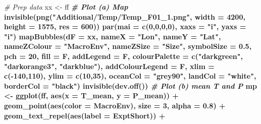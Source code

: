 \documentclass[
]{article}
\newenvironment{Shaded}{\begin{snugshade}}{\end{snugshade}}
\newcommand{\CommentTok}[1]{\textcolor[rgb]{0.56,0.35,0.01}{\textit{#1}}}
\newcommand{\DataTypeTok}[1]{\textcolor[rgb]{0.13,0.29,0.53}{#1}}
\newcommand{\DecValTok}[1]{\textcolor[rgb]{0.00,0.00,0.81}{#1}}
\newcommand{\FloatTok}[1]{\textcolor[rgb]{0.00,0.00,0.81}{#1}}
\newcommand{\KeywordTok}[1]{\textcolor[rgb]{0.13,0.29,0.53}{\textbf{#1}}}
\newcommand{\NormalTok}[1]{#1}
\newcommand{\OperatorTok}[1]{\textcolor[rgb]{0.81,0.36,0.00}{\textbf{#1}}}
\newcommand{\StringTok}[1]{\textcolor[rgb]{0.31,0.60,0.02}{#1}}
\begin{document}
\begin{Shaded}
\begin{Highlighting}[]
\CommentTok{# Prep data}
\NormalTok{xx <-}\StringTok{ }\NormalTok{ff }\OperatorTok{%
\CommentTok{# Plot (a) Map}
\KeywordTok{invisible}\NormalTok{(}\KeywordTok{png}\NormalTok{(}\StringTok{"Additional/Temp/Temp_F01_1.png"}\NormalTok{, }\DataTypeTok{width =} \DecValTok{4200}\NormalTok{, }\DataTypeTok{height =} \DecValTok{1575}\NormalTok{, }\DataTypeTok{res =} \DecValTok{600}\NormalTok{))}
\KeywordTok{par}\NormalTok{(}\DataTypeTok{mai =} \KeywordTok{c}\NormalTok{(}\DecValTok{0}\NormalTok{,}\DecValTok{0}\NormalTok{,}\DecValTok{0}\NormalTok{,}\DecValTok{0}\NormalTok{), }\DataTypeTok{xaxs =} \StringTok{"i"}\NormalTok{, }\DataTypeTok{yaxs =} \StringTok{"i"}\NormalTok{)}
\KeywordTok{mapBubbles}\NormalTok{(}\DataTypeTok{dF =}\NormalTok{ xx, }\DataTypeTok{nameX =} \StringTok{"Lon"}\NormalTok{, }\DataTypeTok{nameY =} \StringTok{"Lat"}\NormalTok{, }\DataTypeTok{nameZColour =} \StringTok{"MacroEnv"}\NormalTok{,}
           \DataTypeTok{nameZSize =} \StringTok{"Size"}\NormalTok{, }\DataTypeTok{symbolSize =} \FloatTok{0.5}\NormalTok{, }\DataTypeTok{pch =} \DecValTok{20}\NormalTok{, }\DataTypeTok{fill =}\NormalTok{ F, }\DataTypeTok{addLegend =}\NormalTok{ F,}
           \DataTypeTok{colourPalette =} \KeywordTok{c}\NormalTok{(}\StringTok{"darkgreen"}\NormalTok{, }\StringTok{"darkorange3"}\NormalTok{, }\StringTok{"darkblue"}\NormalTok{), }\DataTypeTok{addColourLegend =}\NormalTok{ F, }
           \DataTypeTok{xlim =} \KeywordTok{c}\NormalTok{(}\OperatorTok{-}\DecValTok{140}\NormalTok{,}\DecValTok{110}\NormalTok{), }\DataTypeTok{ylim =} \KeywordTok{c}\NormalTok{(}\DecValTok{10}\NormalTok{,}\DecValTok{35}\NormalTok{),  }
           \DataTypeTok{oceanCol =} \StringTok{"grey90"}\NormalTok{, }\DataTypeTok{landCol =} \StringTok{"white"}\NormalTok{, }\DataTypeTok{borderCol =} \StringTok{"black"}\NormalTok{)}
\KeywordTok{invisible}\NormalTok{(}\KeywordTok{dev.off}\NormalTok{())}
\CommentTok{# Plot (b) mean T and P}
\NormalTok{mp <-}\StringTok{ }\KeywordTok{ggplot}\NormalTok{(ff, }\KeywordTok{aes}\NormalTok{(}\DataTypeTok{x =}\NormalTok{ T_mean, }\DataTypeTok{y =}\NormalTok{ P_mean)) }\OperatorTok{+}\StringTok{ }
\StringTok{  }\KeywordTok{geom_point}\NormalTok{(}\KeywordTok{aes}\NormalTok{(}\DataTypeTok{color =}\NormalTok{ MacroEnv), }\DataTypeTok{size =} \DecValTok{3}\NormalTok{, }\DataTypeTok{alpha =} \FloatTok{0.8}\NormalTok{) }\OperatorTok{+}\StringTok{ }
\StringTok{  }\KeywordTok{geom_text_repel}\NormalTok{(}\KeywordTok{aes}\NormalTok{(}\DataTypeTok{label =}\NormalTok{ ExptShort)) }\OperatorTok{+}\StringTok{ }
}
\end{Highlighting}
\end{Shaded}
\end{document}
